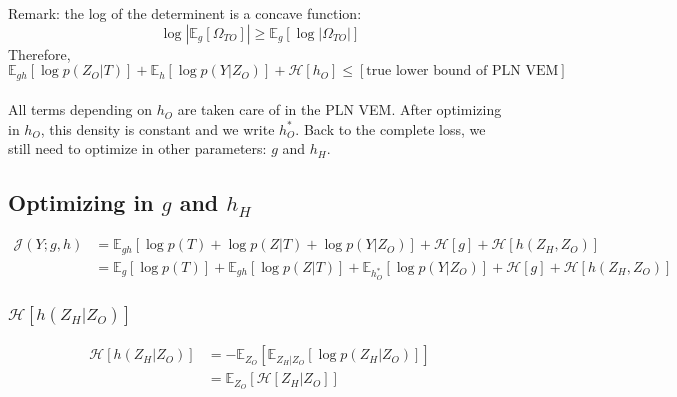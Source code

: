 \documentclass[11pt,a4paper]{article}
\newcommand{\Esp}{\mathds{E}}
\newcommand{\entr}{\mathcal{H}}
\begin{document}
Remark: the log of the determinent is a concave function:
$$\log |\Esp_g[\Omega_{TO}]| \geq \Esp_g [\log |\Omega_{TO}|]$$
Therefore, $$\Esp_{gh}[\log p(Z_O | T)] +\Esp_h[\log p(Y|Z_O)]+ \entr[h_O] \leq [\text{true lower bound of PLN VEM}]$$\\

All terms depending on $h_O$ are taken care of in the PLN VEM. After optimizing in $h_O$, this density is constant and we write $h_O^*$. Back to the complete loss, we still need to optimize in other parameters: $g$ and $h_H$.

\subsection{Optimizing in $g$ and $h_H$}
\begin{align*}
\mathcal{J}(Y; g,h)&= \Esp_{gh}[\log p(T) + \log p(Z|T) + \log p(Y|Z_O)] + \entr[g ] +\entr[h(Z_H,Z_O)]\\
&= \Esp_g[\log p(T)] + \Esp_{gh}[\log p(Z|T)] + \Esp_{h_O^*}[\log p(Y|Z_O)] + \entr[g ] +\entr[h(Z_H,Z_O)]
\end{align*}




\subsubsection{$ \entr[h(Z_H|Z_O)]$}

\begin{align*}
\entr[h(Z_H|Z_O)] &=   - \Esp_{Z_O}\left[\Esp_{Z_H|Z_O}[\log p(Z_H| Z_O)]\right]\\
&= \Esp_{Z_O}\left[\entr[Z_H|Z_O]\right]
\end{align*}
\end{document}
